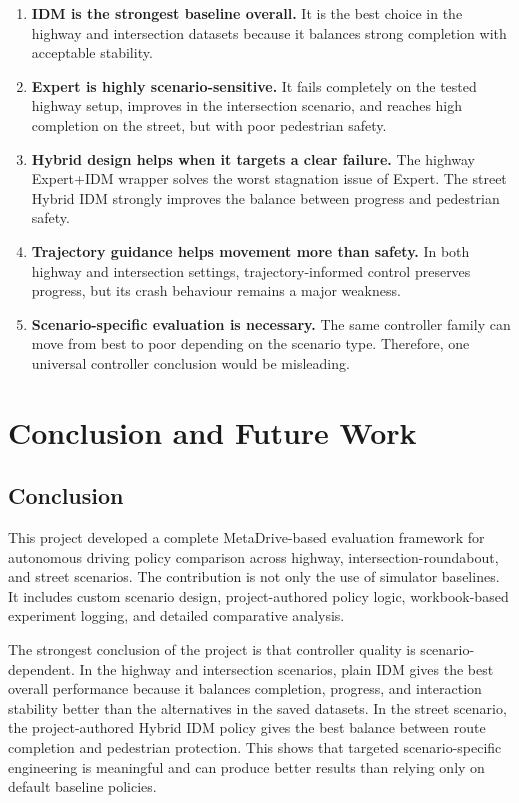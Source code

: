 \documentclass[12pt,a4paper]{report}
\begin{document}
\begin{enumerate}[label=\arabic*.]
    \item \textbf{IDM is the strongest baseline overall.} It is the best choice in the highway and intersection datasets because it balances strong completion with acceptable stability.
    \item \textbf{Expert is highly scenario-sensitive.} It fails completely on the tested highway setup, improves in the intersection scenario, and reaches high completion on the street, but with poor pedestrian safety.
    \item \textbf{Hybrid design helps when it targets a clear failure.} The highway Expert+IDM wrapper solves the worst stagnation issue of Expert. The street Hybrid IDM strongly improves the balance between progress and pedestrian safety.
    \item \textbf{Trajectory guidance helps movement more than safety.} In both highway and intersection settings, trajectory-informed control preserves progress, but its crash behaviour remains a major weakness.
    \item \textbf{Scenario-specific evaluation is necessary.} The same controller family can move from best to poor depending on the scenario type. Therefore, one universal controller conclusion would be misleading.
\end{enumerate}

\chapter{Conclusion and Future Work}

\section{Conclusion}
This project developed a complete MetaDrive-based evaluation framework for autonomous driving policy comparison across highway, intersection-roundabout, and street scenarios. The contribution is not only the use of simulator baselines. It includes custom scenario design, project-authored policy logic, workbook-based experiment logging, and detailed comparative analysis.

The strongest conclusion of the project is that controller quality is scenario-dependent. In the highway and intersection scenarios, plain IDM gives the best overall performance because it balances completion, progress, and interaction stability better than the alternatives in the saved datasets. In the street scenario, the project-authored Hybrid IDM policy gives the best balance between route completion and pedestrian protection. This shows that targeted scenario-specific engineering is meaningful and can produce better results than relying only on default baseline policies.
\end{document}
